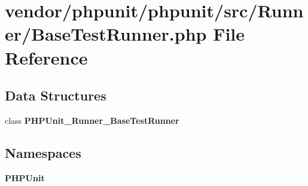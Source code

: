 \section{vendor/phpunit/phpunit/src/\+Runner/\+Base\+Test\+Runner.php File Reference}
\label{_base_test_runner_8php}
\subsection*{Data Structures}
\begin{DoxyCompactItemize}
\item 
class {\bf P\+H\+P\+Unit\+\_\+\+Runner\+\_\+\+Base\+Test\+Runner}
\end{DoxyCompactItemize}
\subsection*{Namespaces}
\begin{DoxyCompactItemize}
\item 
 {\bf P\+H\+P\+Unit}
\end{DoxyCompactItemize}

